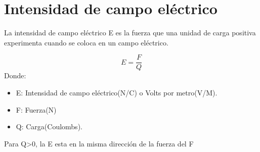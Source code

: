 \documentclass[11pt,fleqn,a4paper,]{LegrandOrangeBook}
\begin{document}
\section{Intensidad de campo eléctrico}
La intensidad de campo eléctrico E es la fuerza que una unidad de carga positiva experimenta cuando se coloca en un campo eléctrico.
\begin{theorem}
\begin{equation}
\label{eq:Intensidadcampoelectrico}
E=\frac{F}{Q}
\end{equation}
Donde:
\begin{itemize}
\item E: Intensidad de campo eléctrico(N/C) o Volts por metro(V/M).
\item F: Fuerza(N)
\item Q: Carga(Coulombs).
\end{itemize}
\end{theorem}
Para Q>0, la E esta en la misma dirección de la fuerza del F
\end{document}
